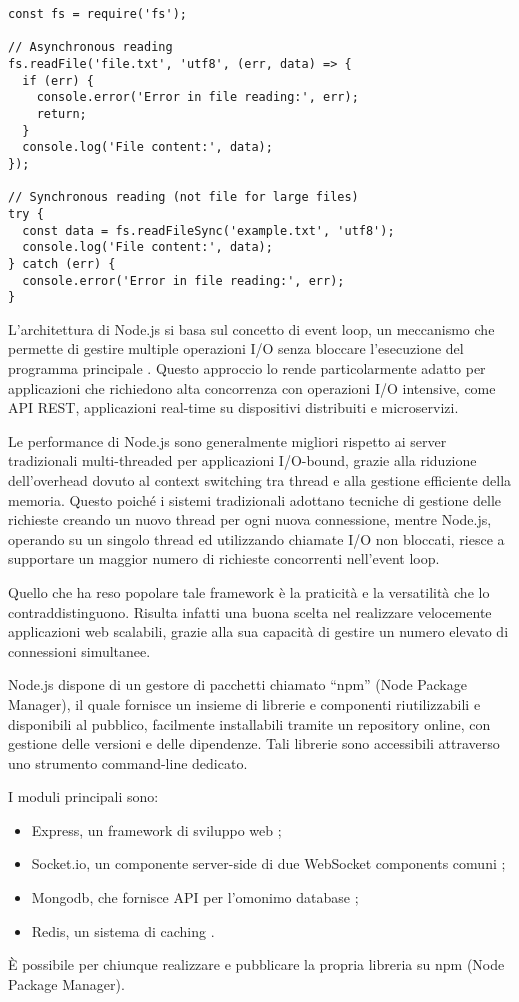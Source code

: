 \begin{lstlisting}[caption={Lettura asincrona di file}]
const fs = require('fs');

// Asynchronous reading
fs.readFile('file.txt', 'utf8', (err, data) => {
  if (err) {
    console.error('Error in file reading:', err);
    return;
  }
  console.log('File content:', data);
});

// Synchronous reading (not file for large files)
try {
  const data = fs.readFileSync('example.txt', 'utf8');
  console.log('File content:', data);
} catch (err) {
  console.error('Error in file reading:', err);
}
\end{lstlisting}

L'architettura di Node.js si basa sul concetto di event loop, un meccanismo che permette di gestire multiple operazioni I/O senza bloccare l'esecuzione del programma principale \citep{nodejs_docs_2023}. Questo approccio lo rende particolarmente adatto per applicazioni che richiedono alta concorrenza con operazioni I/O intensive, come API REST, applicazioni real-time su dispositivi distribuiti e microservizi.

Le performance di Node.js sono generalmente migliori rispetto ai server tradizionali multi-threaded per applicazioni I/O-bound, grazie alla riduzione dell'overhead dovuto al context switching tra thread e alla gestione efficiente della memoria. Questo poiché i sistemi tradizionali adottano tecniche di gestione delle richieste creando un nuovo thread per ogni nuova connessione, mentre Node.js, operando su un singolo thread ed utilizzando chiamate I/O non bloccati, riesce a supportare un maggior numero di richieste concorrenti nell'event loop.

Quello che ha reso popolare tale framework è la praticità e la versatilità che lo contraddistinguono. Risulta infatti una buona scelta nel realizzare velocemente applicazioni web scalabili, grazie alla sua capacità di gestire un numero elevato di connessioni simultanee.

Node.js dispone di un gestore di pacchetti chiamato ``npm'' (Node Package Manager), il quale fornisce un insieme di librerie e componenti riutilizzabili e disponibili al pubblico, facilmente installabili tramite un repository online, con gestione delle versioni e delle dipendenze. Tali librerie sono accessibili attraverso uno strumento command-line dedicato.

I moduli principali sono:
\begin{itemize}
  \item Express, un framework di sviluppo web \cite{express_js};
  \item Socket.io, un componente server-side di due WebSocket components comuni \cite{socket_io};
  \item Mongodb, che fornisce API per l'omonimo database \cite{mongodb};
  \item Redis, un sistema di caching \cite{redis}.
\end{itemize}
È possibile per chiunque realizzare e pubblicare la propria libreria su npm (Node Package Manager).

